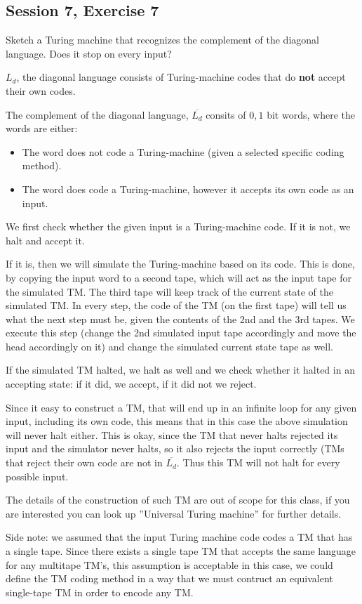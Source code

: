 \subsection {Session 7, Exercise 7}


Sketch a Turing machine that recognizes the complement of the diagonal language. Does it stop on every
input?


$L_d$, the diagonal language consists of Turing-machine codes that do \textbf{not} accept their own codes.

The complement of the diagonal language, $\overline{L_d}$ consits of $0,1$ bit words, where the words are either:
\begin{itemize}
    \item The word does not code a Turing-machine (given a selected specific coding method).
    \item The word does code a Turing-machine, however it accepts its own code as an input.
\end{itemize}

We first check whether the given input is a Turing-machine code. If it is not, we halt and accept it.

If it is, then we will simulate the Turing-machine based on its code. This is done, by copying the input word to a second tape, which will act as the input tape for the simulated TM. The third tape will keep track of the current state of the simulated TM. In every step, the code of the TM (on the first tape) will tell us what the next step must be, given the contents of the 2nd and the 3rd tapes. We execute this step (change the 2nd simulated input tape accordingly and move the head accordingly on it) and change the simulated current state tape as well.

If the simulated TM halted, we halt as well and we check whether it halted in an accepting state: if it did, we accept, if it did not we reject.

Since it easy to construct a TM, that will end up in an infinite loop for any given input, including its own code, this means that in this case the above simulation will never halt either. This is okay, since the TM that never halts rejected its input and the simulator never halts, so it also rejects the input correctly (TMs that reject their own code are not in $\overline{L_d}$. Thus this TM will not halt for every possible input.

The details of the construction of such TM are out of scope for this class, if you are interested you can look up ''Universal Turing machine'' for further details.

Side note: we assumed that the input Turing machine code codes a TM that has a single tape. Since there exists a single tape TM that accepts the same language for any multitape TM's, this assumption is acceptable in this case, we could define the TM coding method in a way that we must contruct an equivalent single-tape TM in order to encode any TM.
